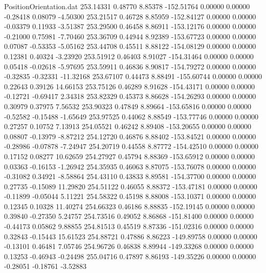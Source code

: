 \begin{filecontents}{PositionOrientation.dat}
 253.14331    0.48770    8.85378  -152.51764    0.00000    0.00000   -0.28418    0.08079   -4.50300
 253.21517    0.46728    8.85959  -152.84127    0.00000    0.00000   -0.03379    0.11933   -3.51387
 253.29500    0.46458    8.86911  -153.12176    0.00000    0.00000   -0.21000    0.75981   -7.70460
 253.36709    0.44944    8.92389  -153.67723    0.00000    0.00000    0.07087   -0.53353   -5.05162
 253.44708    0.45511    8.88122  -154.08129    0.00000    0.00000    0.12381    0.40324   -3.23920
 253.51912    0.46403    8.91027  -154.31464    0.00000    0.00000    0.05418   -0.02618   -5.97695
 253.59911    0.46836    8.90817  -154.79272    0.00000    0.00000   -0.32835   -0.32331  -11.32168
 253.67107    0.44473    8.88491  -155.60744    0.00000    0.00000    0.22643    0.39126   14.66153
 253.75126    0.46289    8.91628  -154.43171    0.00000    0.00000   -0.12721   -0.69417    2.34318
 253.82329    0.45373    8.86628  -154.26293    0.00000    0.00000    0.30979    0.37975    7.56532
 253.90323    0.47849    8.89664  -153.65816    0.00000    0.00000   -0.52582   -0.15488   -1.65649
 253.97525    0.44062    8.88549  -153.77746    0.00000    0.00000    0.27257    0.10752    7.13913
 254.05521    0.46242    8.89408  -153.20655    0.00000    0.00000    0.08807   -0.13979   -8.87212
 254.12720    0.46876    8.88402  -153.84521    0.00000    0.00000   -0.28986   -0.07878   -7.24947
 254.20719    0.44558    8.87772  -154.42510    0.00000    0.00000    0.17152    0.08277   10.62659
 254.27927    0.45794    8.88369  -153.65912    0.00000    0.00000    0.03363   -0.16153   -1.26942
 254.35935    0.46063    8.87075  -153.76078    0.00000    0.00000   -0.31082    0.34921   -8.58864
 254.43110    0.43833    8.89581  -154.37700    0.00000    0.00000    0.27735   -0.15089   11.29820
 254.51122    0.46055    8.88372  -153.47181    0.00000    0.00000   -0.11899   -0.05044    5.11221
 254.58322    0.45198    8.88008  -153.10371    0.00000    0.00000    0.12345    0.10328   11.40274
 254.66323    0.46186    8.88835  -152.19145    0.00000    0.00000    0.39840   -0.27350    5.24757
 254.73516    0.49052    8.86868  -151.81400    0.00000    0.00000   -0.44173    0.05862    9.88855
 254.81513    0.45519    8.87336  -151.02316    0.00000    0.00000    0.32843   -0.15443   15.61523
 254.88721    0.47886    8.86223  -149.89758    0.00000    0.00000   -0.13101    0.46481    7.05746
 254.96726    0.46838    8.89944  -149.33268    0.00000    0.00000    0.13253   -0.46943   -0.24498
 255.04716    0.47897    8.86193  -149.35226    0.00000    0.00000   -0.28051   -0.18761   -3.52883

\end{filecontents}
